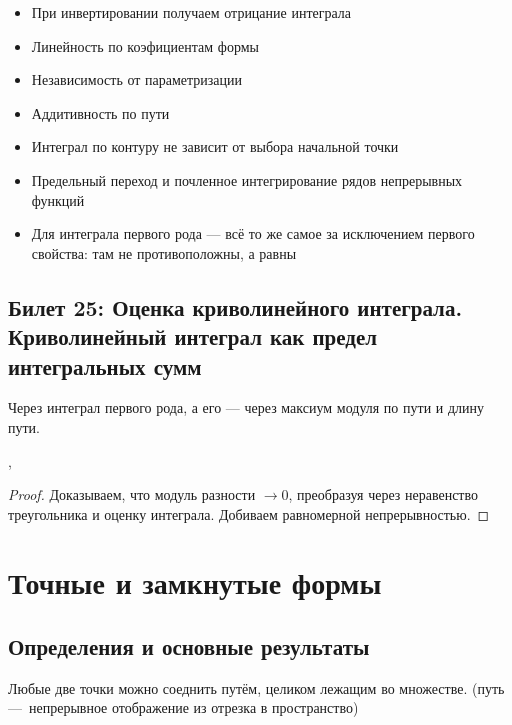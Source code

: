 \documentclass[12pt, a4paper, oneside]{memoir}
\begin{document}
\begin{itemize}
    \item При инвертировании получаем отрицание интеграла
    \item Линейность по коэфициентам формы
    \item Независимость от параметризации
    \item Аддитивность по пути
    \item Интеграл по контуру не зависит от выбора начальной точки
    \item Предельный переход и почленное интегрирование рядов непрерывных функций
    \item Для интеграла первого рода — всё то же самое за исключением первого свойства: там не противоположны, а равны
\end{itemize}

\subsection{Билет 25: Оценка криволинейного интеграла. Криволинейный интеграл как предел интегральных сумм}

\begin{theorem}
    Через интеграл первого рода, а его — через максиум модуля по пути и длину пути.
\end{theorem}, 


\begin{theorem}
    \begin{proof}
        Доказываем, что модуль разности $→ 0$,
        преобразуя через неравенство треугольника и оценку интеграла.
        Добиваем равномерной непрерывностью.
    \end{proof}
\end{theorem}

\section{Точные и замкнутые формы}

\subsection{Определения и основные результаты}

\begin{definition}
    Любые две точки можно соеднить путём, целиком лежащим во множестве.
    (путь — непрерывное отображение из отрезка в пространство)
\end{definition}
\end{document}
